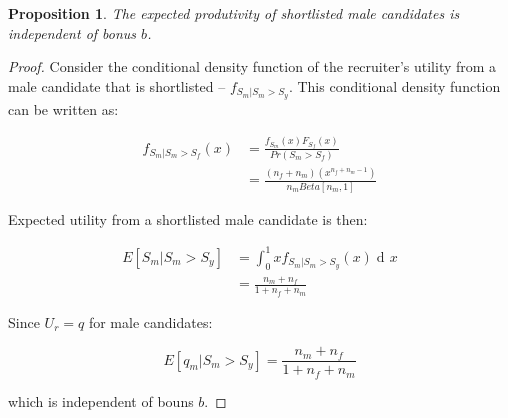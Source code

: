 \documentclass[11pt]{article}
\DeclareMathOperator{\di}{d\!}
\newtheorem{proposition}{Proposition}
\begin{document}
\begin{proposition}\label{prop_male_exp_qual}
    The expected produtivity of shortlisted male candidates is independent of bonus $b$.
\end{proposition}
\begin{proof}
    Consider the conditional density function of the recruiter's utility from a male candidate that is shortlisted --  $f_{S_m|S_m>S_y}$. This conditional density function can be written as:

    \begin{align*}
        f_{S_m|S_m>S_f}(x) & = \frac{f_{S_m}(x)F_{S_f}(x) }{Pr(S_m > S_f)}     \\
                           & = \frac{(n_f+n_m)(x^{n_f+n_m-1})}{n_mBeta[n_m,1]}
    \end{align*}

    Expected utility from a shortlisted male candidate is then:

    \begin{align*}
        E[S_m|S_m > S_y] & = \int_0^1{xf_{S_m|S_m>S_y}(x) \di x} \\
                         & = \frac{n_m + n_f}{1+n_f+n_m}
    \end{align*}

    Since $U_r = q$ for male candidates:

    $$E[q_m|S_m > S_y] = \frac{n_m + n_f}{1+n_f+n_m}$$

    which is independent of bouns $b$.
\end{proof}
\end{document}
